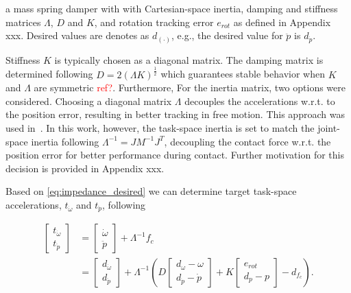 \documentclass[a4paper, 10pt, conference]{ieeeconf}
\begin{document}
    a mass spring damper with with Cartesian-space inertia, damping and stiffness matrices $\Lambda$, $D$ and $K$, and rotation tracking error $e_{rot}$ as defined in Appendix xxx. Desired values are denotes as $d_{(\cdot)}$, e.g., the desired value for $\ddot{p}$ is  $d_{\ddot{p}}$.

    Stiffness $K$ is typically chosen as a diagonal matrix. The damping matrix is determined following $D = 2(\Lambda K)^{\frac{1}{2}}$ which guarantees stable behavior when $K$ and $\Lambda$ are symmetric \textcolor{red}{ref?}. Furthermore, For the inertia matrix, two options were considered. Choosing a diagonal matrix $\Lambda$ decouples the accelerations w.r.t. to the position error, resulting in better tracking in free motion. This approach was used in~\cite{vanoorschotDesignNumericalValidation2022}. In this work, however, the task-space inertia is set to match the joint-space inertia following $\Lambda^{-1} = JM^{-1}J^T$, decoupling the contact force w.r.t. the position error for better performance during contact. Further motivation for this decision is provided in Appendix xxx. %

    Based on \ref{eq:impedance_desired} we can determine target task-space accelerations, $t_{\dot{\omega}}$ and $t_{\ddot{p}}$, following
    
    \begin{align} \begin{bmatrix}t_{\dot{\omega}}\\ t_{\ddot{p}}\end{bmatrix} &= \begin{bmatrix} {\dot{\omega}}\\{\ddot{p}}\end{bmatrix}+\Lambda^{-1} f_c\\
     &=     \begin{bmatrix} d_{\dot{\omega}}    \\ d_{\ddot{p}}  \end{bmatrix} +\Lambda^{-1} \left ( D \begin{bmatrix}d_\omega - {\omega} \\ d_{\dot{p}} - \dot{p} \end{bmatrix}  + K \begin{bmatrix} e_{rot} \\d_p - {p}  \end{bmatrix}- d_{f_c} \right ).
    \end{align}
\end{document}
